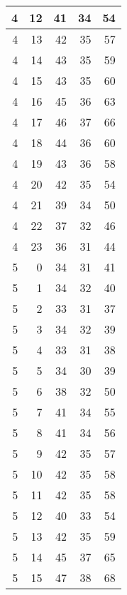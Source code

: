 \begin{longtable}{|r|r|r|r|r|}
    \hline
    4     & 12    & 41    & 34    & 54 \\
    \hline
    4     & 13    & 42    & 35    & 57 \\
    \hline
    4     & 14    & 43    & 35    & 59 \\
    \hline
    4     & 15    & 43    & 35    & 60 \\
    \hline
    4     & 16    & 45    & 36    & 63 \\
    \hline
    4     & 17    & 46    & 37    & 66 \\
    \hline
    4     & 18    & 44    & 36    & 60 \\
    \hline
    4     & 19    & 43    & 36    & 58 \\
    \hline
    4     & 20    & 42    & 35    & 54 \\
    \hline
    4     & 21    & 39    & 34    & 50 \\
    \hline
    4     & 22    & 37    & 32    & 46 \\
    \hline
    4     & 23    & 36    & 31    & 44 \\
    \hline
    5     & 0     & 34    & 31    & 41 \\
    \hline
    5     & 1     & 34    & 32    & 40 \\
    \hline
    5     & 2     & 33    & 31    & 37 \\
    \hline
    5     & 3     & 34    & 32    & 39 \\
    \hline
    5     & 4     & 33    & 31    & 38 \\
    \hline
    5     & 5     & 34    & 30    & 39 \\
    \hline
    5     & 6     & 38    & 32    & 50 \\
    \hline
    5     & 7     & 41    & 34    & 55 \\
    \hline
    5     & 8     & 41    & 34    & 56 \\
    \hline
    5     & 9     & 42    & 35    & 57 \\
    \hline
    5     & 10    & 42    & 35    & 58 \\
    \hline
    5     & 11    & 42    & 35    & 58 \\
    \hline
    5     & 12    & 40    & 33    & 54 \\
    \hline
    5     & 13    & 42    & 35    & 59 \\
    \hline
    5     & 14    & 45    & 37    & 65 \\
    \hline
    5     & 15    & 47    & 38    & 68 \\

\end{longtable}
